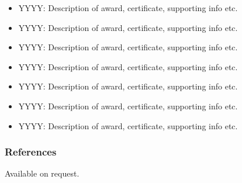 \documentclass[11pt, a4paper]{article}
\providecommand{\tightlist}{%
  \setlength{\itemsep}{0pt}\setlength{\parskip}{0pt}}
\begin{document}
\begin{raggedright}
\begin{itemize}
\tightlist
\item
  YYYY: Description of award, certificate, supporting info etc.
\item
  YYYY: Description of award, certificate, supporting info etc.
\item
  YYYY: Description of award, certificate, supporting info etc.
\item
  YYYY: Description of award, certificate, supporting info etc.
\item
  YYYY: Description of award, certificate, supporting info etc.
\item
  YYYY: Description of award, certificate, supporting info etc.
\item
  YYYY: Description of award, certificate, supporting info etc.
\end{itemize}

\hypertarget{references}{%
\subsubsection{References}\label{references}}

Available on request.
\end{raggedright}
\end{document}
